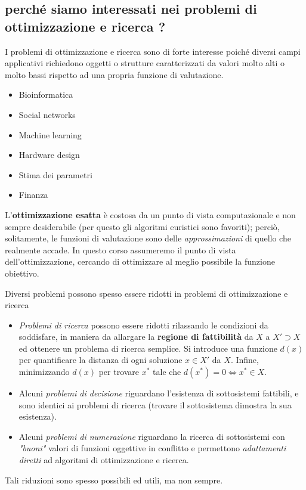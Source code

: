 \documentclass{article}
\begin{document}
\subsection{perché siamo interessati nei problemi di ottimizzazione e ricerca ?}

I problemi di ottimizzazione e ricerca sono di forte interesse poiché diversi campi applicativi richiedono oggetti o strutture caratterizzati da valori molto alti o molto bassi rispetto ad una propria funzione di valutazione.
\begin{itemize}
    \item Bioinformatica
    \item Social networks
    \item Machine learning
    \item Hardware design
    \item Stima dei parametri
    \item Finanza
\end{itemize}

L'\textbf{ottimizzazione esatta} è costosa da un punto di vista computazionale e non sempre desiderabile (per questo gli algoritmi euristici sono favoriti);
perciò, solitamente, le funzioni di valutazione sono delle \textit{approssimazioni} di quello che realmente accade. In questo corso assumeremo il punto di vista dell'ottimizzazione, cercando di ottimizzare al meglio possibile la funzione obiettivo.

Diversi problemi possono spesso essere ridotti in problemi di ottimizzazione e ricerca
\begin{itemize}
    \item \textit{Problemi di ricerca} possono essere ridotti rilassando le condizioni da soddisfare, in maniera da allargare la \textbf{regione di fattibilità}
          da $X$ a $X'\supset X$ ed ottenere un problema di ricerca semplice. Si introduce una funzione $d(x)$ per quantificare la distanza di ogni soluzione $x\in X'$ da $X$. Infine, minimizzando $d(x)$ per trovare $x^*$ tale che $d(x^*)=0 \Leftrightarrow x^* \in X$.
    \item Alcuni \textit{problemi di decisione} riguardano l'esistenza di sottosistemi fattibili, e sono identici ai problemi di
          ricerca (trovare il sottosistema dimostra la sua esistenza).
    \item Alcuni \textit{problemi di numerazione} riguardano la ricerca di sottosistemi con \textit{"buoni"} valori di funzioni oggettive in conflitto e permettono
          \textit{adattamenti diretti} ad algoritmi di ottimizzazione e ricerca.
\end{itemize}
Tali riduzioni sono spesso possibili ed utili, ma non sempre.
\end{document}
